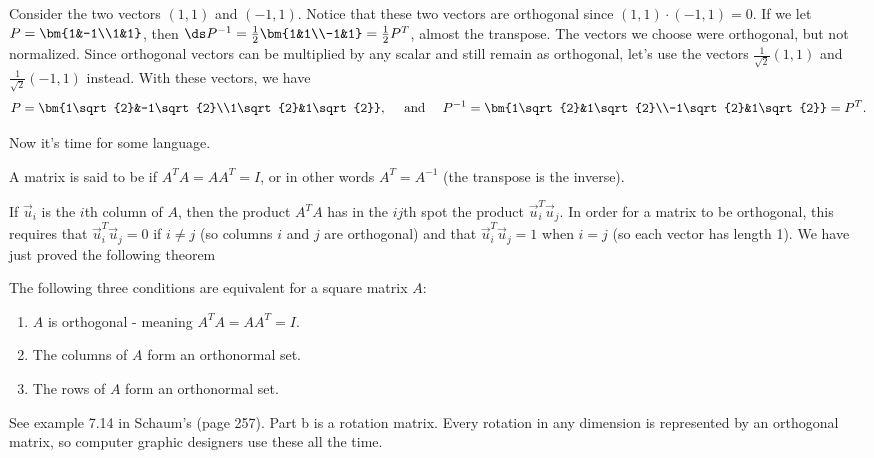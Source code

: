 \begin{example}
Consider the two vectors $(1,1)$ and $(-1,1)$. 
Notice that these two vectors are orthogonal since $(1,1)\cdot(-1,1)=0$. 
If we let $P = \bm{1&-1\\1&1}$, then $\ds P^{-1} = \frac{1}{2}\bm{1&1\\-1&1} = \frac{1}{2}P^T$, almost the transpose.
The vectors we choose were orthogonal, but not normalized. Since orthogonal vectors can be multiplied by any scalar and still remain as orthogonal, let's use the vectors $\frac{1}{\sqrt{2}}(1,1)$ and $\frac{1}{\sqrt{2}}(-1,1)$ instead. With these vectors, we have 
$$P = \bm{1\sqrt{2}&-1\sqrt{2}\\1\sqrt{2}&1\sqrt{2}}, \quad\text{ and }\quad P^{-1} = \bm{1\sqrt{2}&1\sqrt{2}\\-1\sqrt{2}&1\sqrt{2}} = P^T.$$ 
\end{example}

Now it's time for some language.
\begin{definition}
A matrix is said to be  if $A^TA=AA^T=I$, or in other words $A^T=A^{-1}$ (the transpose is the inverse).  
\end{definition}
 If $\vec u_i$ is the $i$th column of $A$, then the product $A^TA$ has in  the $ij$th spot the product $\vec u_i^T \vec u_j$.  In order for a matrix to be orthogonal, this requires that $\vec u_i^T \vec u_j=0$ if $i\neq j$ (so columns $i$ and $j$ are orthogonal) and that $\vec u_i^T \vec u_j=1$ when $i=j$ (so each vector has length 1).  We have just proved the following theorem
\begin{theorem}
The following three conditions are equivalent for a square matrix $A$:
\begin{enumerate}
	\item $A$ is orthogonal - meaning $A^TA=AA^T=I$.
	\item The columns of $A$ form an orthonormal set.
	\item The rows of $A$ form an orthonormal set.
\end{enumerate}
\end{theorem}

\begin{example}
See example 7.14 in Schaum's (page 257). Part b is a rotation matrix. Every rotation in any dimension is represented by an orthogonal matrix, so computer graphic designers use these all the time.
\end{example}


